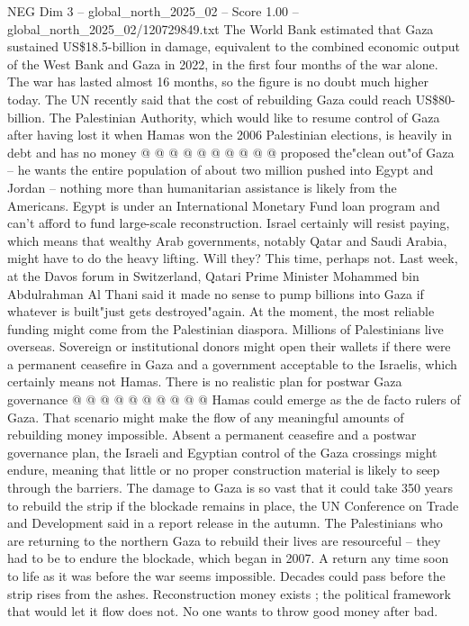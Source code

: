 \begin{textsample}{NEG Dim 3 – global\_north\_2025\_02 – Score 1.00 – global\_north\_2025\_02/120729849.txt}
The World Bank estimated that Gaza sustained US\$18.5-billion in damage, equivalent to the combined economic output of the West Bank and Gaza in 2022, in the first four months of the war alone.
The war has lasted almost 16 months, so the figure is no doubt much higher today.
The UN recently said that the cost of rebuilding Gaza could reach US\$80-billion.
The Palestinian Authority, which would like to resume control of Gaza after having lost it when Hamas won the 2006 Palestinian elections, is heavily in debt and has no money @ @ @ @ @ @ @ @ @ @ proposed the"clean out"of Gaza -- he wants the entire population of about two million pushed into Egypt and Jordan -- nothing more than humanitarian assistance is likely from the Americans.
Egypt is under an International Monetary Fund loan program and can't afford to fund large-scale reconstruction.
Israel certainly will resist paying, which means that wealthy Arab governments, notably Qatar and Saudi Arabia, might have to do the heavy lifting.
Will they?
This time, perhaps not.
Last week, at the Davos forum in Switzerland, Qatari Prime Minister Mohammed bin Abdulrahman Al Thani said it made no sense to pump billions into Gaza if whatever is built"just gets destroyed"again.
At the moment, the most reliable funding might come from the Palestinian diaspora.
Millions of Palestinians live overseas.
Sovereign or institutional donors might open their wallets if there were a permanent ceasefire in Gaza and a government acceptable to the Israelis, which certainly means not Hamas.
There is no realistic plan for postwar Gaza governance @ @ @ @ @ @ @ @ @ @ Hamas could emerge as the de facto rulers of Gaza.
That scenario might make the flow of any meaningful amounts of rebuilding money impossible.
Absent a permanent ceasefire and a postwar governance plan, the Israeli and Egyptian control of the Gaza crossings might endure, meaning that little or no proper construction material is likely to seep through the barriers.
The damage to Gaza is so vast that it could take 350 years to rebuild the strip if the blockade remains in place, the UN Conference on Trade and Development said in a report release in the autumn.
The Palestinians who are returning to the northern Gaza to rebuild their lives are resourceful -- they had to be to endure the blockade, which began in 2007.
A return any time soon to life as it was before the war seems impossible.
Decades could pass before the strip rises from the ashes.
Reconstruction money exists ; the political framework that would let it flow does not.
No one wants to throw good money after bad.

\end{textsample}
